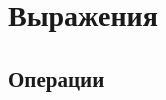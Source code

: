 \hypertarget{expressions}{%
\section{Выражения}\label{expr:chapter}}

\hypertarget{operators}{%
\subsection{Операции}\label{expr:operators}}